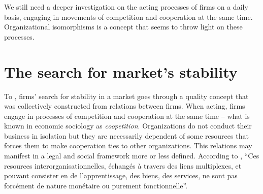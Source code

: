 \documentclass[a4paper, 12pt, openright, oneside, german, french, brazil, english, article]{abntex2}
\begin{document}

	We still need a deeper investigation on the acting processes of firms on a daily basis, engaging in movements of competition and cooperation at the same time. Organizational isomorphisms is a concept that seems to throw light on these processes.

        
	\section{The search for market's stability}
	
	To , firms' search for stability in a market goes through a quality concept that was collectively constructed from relations between firms. When acting, firms engage in processes of competition and cooperation at the same time -- what is known in economic sociology as \textit{coopetition}. Organizations do not conduct their business in isolation but they are necessarily dependent of some resources that forces them to make cooperation ties to other organizations. This relations may manifest in a legal and social framework more or less defined. According to , ``Ces resources interorganisationnelles, échangés à travers des liens multiplexes, et pouvant consister en de l'apprentissage, des biens, des services, ne sont pas forcément de nature monétaire ou purement fonctionnelle''.
	
\end{document}
